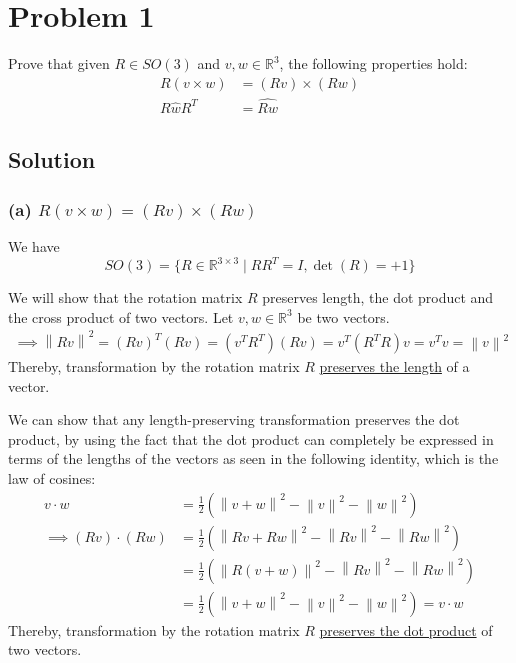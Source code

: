 \section*{Problem 1}

Prove that given \(R \in S O(3)\) and \(v, w \in \mathbb{R}^{3}\), the following properties hold:
\begin{align*}
    R(v \times w)   & =(R v) \times(R w) \\
    R \hat{w} R^{T} & =\widehat{R w}
\end{align*}

\subsection*{Solution}

\subsubsection*{(a) \( R(v \times w) =(R v) \times(R w) \)}

We have
\[
    SO(3) = \{ R \in \mathbb{R}^{3 \times 3} \mid R R^{T} = I, \det(R) = +1 \}
\]

We will show that the rotation matrix \( R \) preserves length, the dot product and the cross product of two vectors.
Let \( v, w \in \mathbb{R}^{3} \) be two vectors.
\begin{align*}
    \implies
    \left \| R v \right \| ^{2}
        = {(R v)}^{T} (R v)
    = (v^{T} R^{T}) (R v)
    = v^{T} (R^{T} R) v
    = v^{T} v
    = \left \| v \right \| ^{2}
\end{align*}
Thereby, transformation by the rotation matrix \( R \) \underline{preserves the length} of a vector.

We can show that any length-preserving transformation preserves the dot product, by using the fact that the dot product can completely be expressed in terms of the lengths of the vectors as seen in the following identity, which is the law of cosines:
\begin{align*}
    v \cdot w
     & = \frac{1}{2} \left( \left \| v + w \right \| ^{2} - \left \| v \right \| ^{2} - \left \| w \right \| ^{2} \right)
    \\ \implies
    (R v) \cdot (R w)
     & = \frac{1}{2} \left( \left \| R v + R w \right \| ^{2} - \left \| R v \right \| ^{2} - \left \| R w \right \| ^{2} \right)
    \\ & = \frac{1}{2} \left( \left \| R (v + w) \right \| ^{2} - \left \| R v \right \| ^{2} - \left \| R w \right \| ^{2} \right)
    \\ & = \frac{1}{2} \left( \left \| v + w \right \| ^{2} - \left \| v \right \| ^{2} - \left \| w \right \| ^{2} \right)
    = v \cdot w
\end{align*}
Thereby, transformation by the rotation matrix \( R \) \underline{preserves the dot product} of two vectors.

